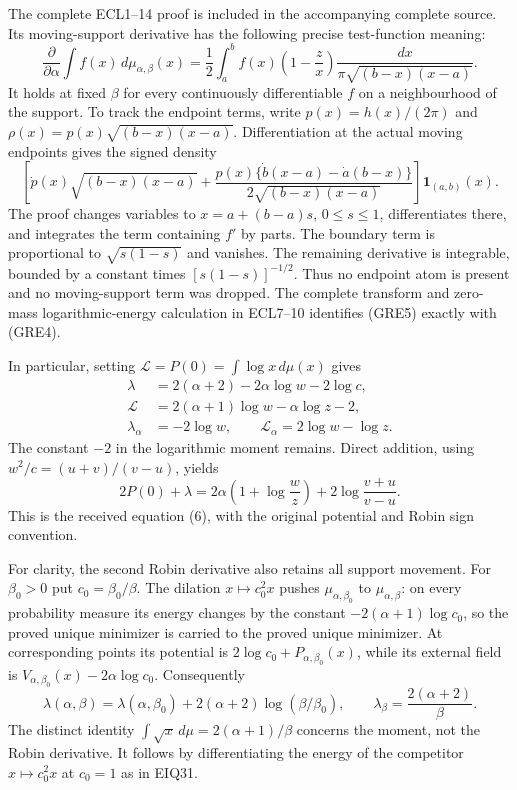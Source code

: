 \documentclass[11pt,a4paper]{article}
\begin{document}
The complete ECL1--14 proof is included in the accompanying complete source. Its moving-support
derivative has the following precise test-function meaning:
\[
 \frac{\partial}{\partial\alpha}\int f(x)\,d\mu_{\alpha,\beta}(x)
 =\frac12\int_a^b f(x)\left(1-\frac z x\right)
       \frac{dx}{\pi\sqrt{(b-x)(x-a)}}.
 \tag{GRE4}
\]
It holds at fixed $\beta$ for every continuously differentiable $f$
on a neighbourhood of the support. To track the endpoint terms,
write $p(x)=h(x)/(2\pi)$ and $\rho(x)=p(x)\sqrt{(b-x)(x-a)}$.
Differentiation at the actual moving endpoints gives the signed density
\[
 \left[\dot p(x)\sqrt{(b-x)(x-a)}+
 \frac{p(x)\{\dot b(x-a)-\dot a(b-x)\}}
 {2\sqrt{(b-x)(x-a)}}\right]\mathbf1_{(a,b)}(x).
 \tag{GRE5}
\]
The proof changes variables to $x=a+(b-a)s$, $0\le s\le1$,
differentiates there, and integrates the term containing $f'$ by
parts. The boundary term is proportional to $\sqrt{s(1-s)}$ and
vanishes. The remaining derivative is integrable, bounded by a
constant times $[s(1-s)]^{-1/2}$. Thus no endpoint atom is present
and no moving-support term was dropped. The complete transform and
zero-mass logarithmic-energy calculation in ECL7--10 identifies
(GRE5) exactly with (GRE4).

In particular, setting $\mathcal L=P(0)=\int\log x\,d\mu(x)$ gives
\[
 \begin{split}
 \lambda&=2(\alpha+2)-2\alpha\log w-2\log c,\\
 \mathcal L&=2(\alpha+1)\log w-\alpha\log z-2,\\
 \lambda_\alpha&=-2\log w,\qquad
 \mathcal L_\alpha=2\log w-\log z.
 \end{split}\tag{GRE6}
\]
The constant $-2$ in the logarithmic moment remains. Direct addition,
using $w^2/c=(u+v)/(v-u)$, yields
\[
 \boxed{2P(0)+\lambda
 =2\alpha\left(1+\log\frac w z\right)
      +2\log\frac{v+u}{v-u}.}
 \tag{GRE7}
\]
This is the received equation (6), with the original potential and
Robin sign convention.

For clarity, the second Robin derivative also retains all support
movement. For $\beta_0>0$ put $c_0=\beta_0/\beta$. The dilation
$x\mapsto c_0^2x$ pushes $\mu_{\alpha,\beta_0}$ to
$\mu_{\alpha,\beta}$: on every probability measure its energy changes
by the constant $-2(\alpha+1)\log c_0$, so the proved unique
minimizer is carried to the proved unique minimizer. At corresponding
points its potential is $2\log c_0+P_{\alpha,\beta_0}(x)$, while
its external field is $V_{\alpha,\beta_0}(x)-2\alpha\log c_0$.
Consequently
\[
 \lambda(\alpha,\beta)
 =\lambda(\alpha,\beta_0)
       +2(\alpha+2)\log(\beta/\beta_0),\qquad
 \boxed{\lambda_\beta=\frac{2(\alpha+2)}\beta.}
 \tag{GRE8}
\]
The distinct identity
$\int\sqrt x\,d\mu=2(\alpha+1)/\beta$ concerns the moment, not
the Robin derivative. It follows by differentiating the energy of
the competitor $x\mapsto c_0^2x$ at $c_0=1$ as in EIQ31.
\end{document}
